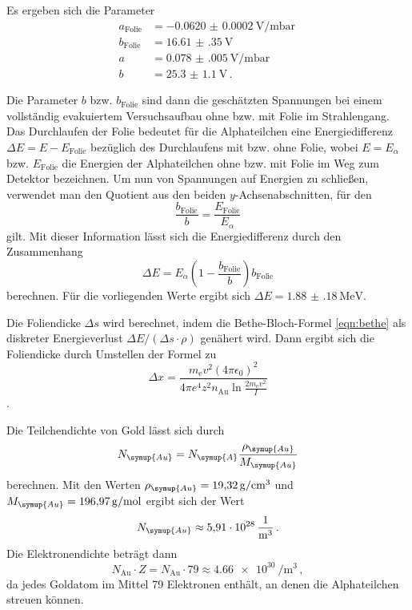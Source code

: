 Es ergeben sich die Parameter
\begin{align*}
  a_{\text{Folie}}&=\SI{-0.0620(002)}{\volt\per\milli\bar} \, \\
  b_{\text{Folie}}&=\SI{16.61(35)}{\volt} \,\\
  a&=\SI{0.078(005)}{\volt\per\milli\bar} \, \\
  b&=\SI{25.3(11)}{\volt} \,.
\end{align*}

Die Parameter $b$ bzw. $b_{\text{Folie}}$ sind dann die geschätzten Spannungen bei einem vollständig evakuiertem Versuchsaufbau ohne bzw. mit Folie im Strahlengang.
Das Durchlaufen der Folie bedeutet für die Alphateilchen eine Energiedifferenz $\Delta E = E-E_{\text{Folie}}$ bezüglich des Durchlaufens mit bzw. ohne Folie, wobei $E = E_\alpha$ bzw. $E_{\text{Folie}}$ die Energien der Alphateilchen ohne bzw. mit Folie im Weg zum Detektor bezeichnen.
Um nun von Spannungen auf Energien zu schließen, verwendet man den Quotient aus den beiden $y$-Achsenabschnitten, für den
\begin{equation*}
  \frac{b_{\text{Folie}}}{b} = \frac{E_{\text{Folie}}}{E_\alpha}
\end{equation*}
gilt. Mit dieser Information lässt sich die Energiedifferenz durch den Zusammenhang
\begin{equation*}
  \Delta E = E_\alpha \left( 1 - \frac{b_{\text{Folie}}}{b} \right)b_{\text{Folie}}
\end{equation*}
berechnen. Für die vorliegenden Werte ergibt sich $\Delta E = \SI{1.88(18)}{\mega\electronvolt}$.

Die Foliendicke $\Delta s$ wird berechnet, indem die Bethe-Bloch-Formel \eqref{eqn:bethe} als diskreter Energieverlust $\Delta E/(\Delta s \cdot \rho)$ genähert wird.
Dann ergibt sich die Foliendicke durch Umstellen der Formel zu
\begin{equation*}
  \Delta x =
  \frac{m_{\mathrm{e}} v^2(4 \pi \epsilon_{\mathrm{0}})^2}
  {4\pi e^4 z^2 n_\text{Au} \ln{\frac{2 m_{\mathrm{e}} v^2}{I}}}
\end{equation*}.

Die Teilchendichte von Gold lässt sich durch
\begin{equation*}
  N_{\symup{Au}} = N_{\symup{A}} \frac{\rho_{\symup{Au}}}{M_{\symup{Au}}}
\end{equation*}
berechnen. Mit den Werten $\rho_{\symup{Au}}=\SI{19.32}{\gram\per\cubic\centi\metre}$ \cite{rho}
und ${M_{\symup{Au}}}=\SI{196.97}{\gram\per\mol}$ \cite{molmasse}
ergibt sich der Wert
\begin{equation*}
  N_{\symup{Au}} \approx \SI{5.91e28}{\per\cubic\metre}\,.
\end{equation*}
Die Elektronendichte beträgt dann
\begin{equation}
  N_\text{Au} \cdot Z = N_\text{Au} \cdot 79 \approx \SI{4.66e30}{\per\cubic\metre}\,,
\end{equation}
da jedes Goldatom im Mittel 79 Elektronen enthält, an denen die Alphateilchen streuen können.

